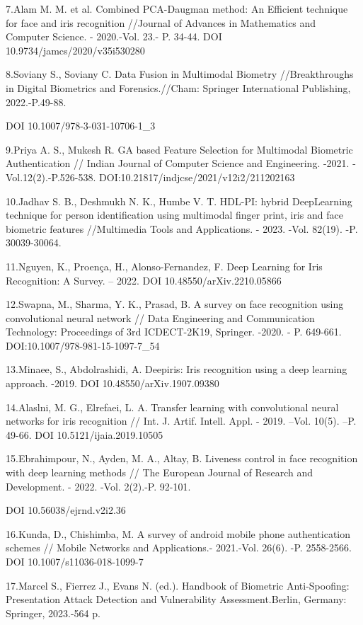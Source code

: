 7.Alam M. M. et al. Combined PCA-Daugman method: An Efficient technique
for face and iris recognition //Journal of Advances in Mathematics and
Computer Science. - 2020.-Vol. 23.- P. 34-44. DOI
10.9734/jamcs/2020/v35i530280

8.Soviany S., Soviany C. Data Fusion in Multimodal Biometry
//Breakthroughs in Digital Biometrics and Forensics.//Cham: Springer
International Publishing, 2022.-P.49-88.

DOI 10.1007/978-3-031-10706-1\_3

9.Priya A. S., Mukesh R. GA based Feature Selection for Multimodal
Biometric Authentication // Indian Journal of Computer Science and
Engineering. -2021. -Vol.12(2).-P.526-538.
DOI:10.21817/indjcse/2021/v12i2/211202163

10.Jadhav S. B., Deshmukh N. K., Humbe V. T. HDL-PI: hybrid DeepLearning
technique for person identification using multimodal finger print, iris
and face biometric features //Multimedia Tools and Applications. - 2023.
-Vol. 82(19). -P. 30039-30064.

11.Nguyen, K., Proença, H., Alonso-Fernandez, F. Deep Learning for Iris
Recognition: A Survey. -- 2022. DOI 10.48550/arXiv.2210.05866

12.Swapna, M., Sharma, Y. K., Prasad, B. A survey on face recognition
using convolutional neural network // Data Engineering and Communication
Technology: Proceedings of 3rd ICDECT-2K19, Springer. -2020. - P.
649-661. DOI:10.1007/978-981-15-1097-7\_54

13.Minaee, S., Abdolrashidi, A. Deepiris: Iris recognition using a deep
learning approach. -2019. DOI 10.48550/arXiv.1907.09380

14.Alaslni, M. G., Elrefaei, L. A. Transfer learning with convolutional
neural networks for iris recognition // Int. J. Artif. Intell. Appl. -
2019. --Vol. 10(5). --P. 49-66. DOI 10.5121/ijaia.2019.10505

15.Ebrahimpour, N., Ayden, M. A., Altay, B. Liveness control in face
recognition with deep learning methods // The European Journal of
Research and Development. - 2022. -Vol. 2(2).-P. 92-101.

DOI 10.56038/ejrnd.v2i2.36

16.Kunda, D., Chishimba, M. A survey of android mobile phone
authentication schemes // Mobile Networks and Applications.- 2021.-Vol.
26(6). -P. 2558-2566. DOI 10.1007/s11036-018-1099-7

17.Marcel S., Fierrez J., Evans N. (ed.). Handbook of Biometric
Anti-Spoofing: Presentation Attack Detection and Vulnerability
Assessment.Berlin, Germany: Springer, 2023.-564 p.


